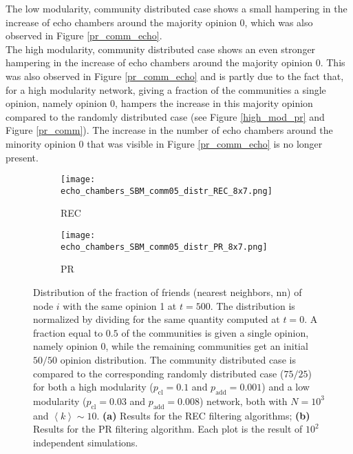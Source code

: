 \documentclass[11 pt , letterpaper , twoside , openright]{book}
\begin{document}
The low modularity, community distributed case shows a small hampering in the increase of echo chambers around the majority opinion 0, which was also observed in Figure \ref{pr_comm_echo}.\\
The high modularity, community distributed case shows an even stronger hampering in the increase of echo chambers around the majority opinion 0. This was also observed in Figure \ref{pr_comm_echo} and is partly due to the fact that, for a high modularity network, giving a fraction of the communities a single opinion, namely opinion 0, hampers the increase in this majority opinion compared to the randomly distributed case (see Figure \ref{high_mod_pr} and Figure \ref{pr_comm}). The increase in the number of echo chambers around the minority opinion 0 that was visible in Figure \ref{pr_comm_echo} is no longer present.

\begin{figure}[H]
  \begin{subfigure}[b]{0.49\textwidth}
  	\texttt{[image: echo\_chambers\_SBM\_comm05\_distr\_REC\_8x7.png]}
    \caption{REC}
    \label{rec_comm05_echo}
  \end{subfigure}
  \begin{subfigure}[b]{0.49\textwidth}
  	\texttt{[image: echo\_chambers\_SBM\_comm05\_distr\_PR\_8x7.png]}
    \caption{PR}
    \label{pr_comm05_echo}
  \end{subfigure}
  \captionsetup{format=plain}
  \caption[Distribution of the fraction of friends (nearest neighbors, nn) of node $i$ with the same opinion 1 at $t = 500$. A fraction equal to $0.5$ of the communities is given a single opinion, namely opinion 0, while the remaining communities get an initial $50/50$ opinion distribution. The community distributed case is compared to the corresponding randomly distributed case ($75/25$) for both a high modularity and a low modularity network. Results for the REC and PR filtering algorithm.]{Distribution of the fraction of friends (nearest neighbors, nn) of node $i$ with the same opinion 1 at $t = 500$. The distribution is normalized by dividing for the same quantity computed at $t=0$. A fraction equal to $0.5$ of the communities is given a single opinion, namely opinion 0, while the remaining communities get an initial $50/50$ opinion distribution. The community distributed case is compared to the corresponding randomly distributed case ($75/25$) for both a high modularity ($p_{\text{cl}} = 0.1$ and $p_{\text{add}} = 0.001$) and a low modularity ($p_{\text{cl}} = 0.03$ and $p_{\text{add}} = 0.008$) network, both with $N=10^3$ and $\left<k\right> \sim 10$. \textbf{(a)} Results for the REC filtering algorithms; \textbf{(b)} Results for the PR filtering algorithm. Each plot is the result of $10^2$ independent simulations.}
\label{echo_05_commOp0_other_50-50}
\end{figure}
\end{document}

